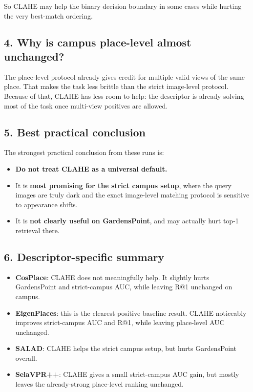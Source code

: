 \documentclass[11pt]{article}
\begin{document}
So CLAHE may help the binary decision boundary in some cases while hurting the very best-match ordering.

\subsection*{4. Why is campus place-level almost unchanged?}
The place-level protocol already gives credit for multiple valid views of the same place. That makes the task less brittle than the strict image-level protocol. Because of that, CLAHE has less room to help: the descriptor is already solving most of the task once multi-view positives are allowed.

\subsection*{5. Best practical conclusion}
The strongest practical conclusion from these runs is:
\begin{itemize}[leftmargin=*]
  \item \textbf{Do not treat CLAHE as a universal default.}
  \item It is \textbf{most promising for the strict campus setup}, where the query images are truly dark and the exact image-level matching protocol is sensitive to appearance shifts.
  \item It is \textbf{not clearly useful on GardensPoint}, and may actually hurt top-1 retrieval there.
\end{itemize}

\subsection*{6. Descriptor-specific summary}
\begin{itemize}[leftmargin=*]
  \item \textbf{CosPlace}: CLAHE does not meaningfully help. It slightly hurts GardensPoint and strict-campus AUC, while leaving R@1 unchanged on campus.
  \item \textbf{EigenPlaces}: this is the clearest positive baseline result. CLAHE noticeably improves strict-campus AUC and R@1, while leaving place-level AUC unchanged.
  \item \textbf{SALAD}: CLAHE helps the strict campus setup, but hurts GardensPoint overall.
  \item \textbf{SelaVPR++}: CLAHE gives a small strict-campus AUC gain, but mostly leaves the already-strong place-level ranking unchanged.
\end{itemize}
\end{document}
